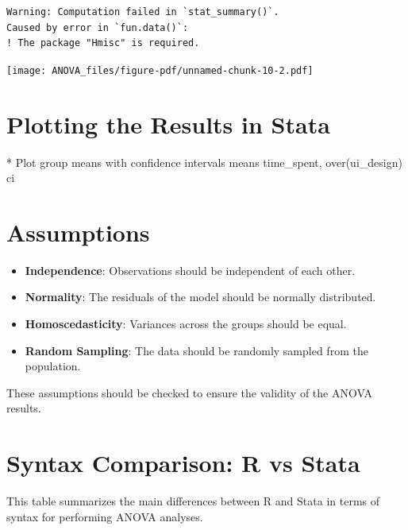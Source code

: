\documentclass[
  letterpaper,
  DIV=11,
  numbers=noendperiod]{scrreprt}
\newenvironment{Shaded}{\begin{snugshade}}{\end{snugshade}}
\newcommand{\BaseNTok}[1]{\textcolor[rgb]{0.68,0.00,0.00}{#1}}
\newcommand{\FunctionTok}[1]{\textcolor[rgb]{0.28,0.35,0.67}{#1}}
\newcommand{\KeywordTok}[1]{\textcolor[rgb]{0.00,0.23,0.31}{#1}}
\newcommand{\NormalTok}[1]{\textcolor[rgb]{0.00,0.23,0.31}{#1}}
\providecommand{\tightlist}{%
  \setlength{\itemsep}{0pt}\setlength{\parskip}{0pt}}\usepackage{longtable,booktabs,array}
\begin{document}
\begin{verbatim}
Warning: Computation failed in `stat_summary()`.
Caused by error in `fun.data()`:
! The package "Hmisc" is required.
\end{verbatim}

\texttt{[image: ANOVA\_files/figure-pdf/unnamed-chunk-10-2.pdf]}

\section{Plotting the Results in
Stata}\label{plotting-the-results-in-stata}

\begin{Shaded}
\begin{Highlighting}[]
\NormalTok{* Plot }\FunctionTok{group} \KeywordTok{means}\NormalTok{ with confidence intervals}
\KeywordTok{means}\NormalTok{ time\_spent, }\BaseNTok{over}\NormalTok{(ui\_design) }\KeywordTok{ci}
\end{Highlighting}
\end{Shaded}

\section{Assumptions}\label{assumptions}

\begin{itemize}
\tightlist
\item
  \textbf{Independence}: Observations should be independent of each
  other.
\item
  \textbf{Normality}: The residuals of the model should be normally
  distributed.
\item
  \textbf{Homoscedasticity}: Variances across the groups should be
  equal.
\item
  \textbf{Random Sampling}: The data should be randomly sampled from the
  population.
\end{itemize}

These assumptions should be checked to ensure the validity of the ANOVA
results.

\section{Syntax Comparison: R vs
Stata}\label{syntax-comparison-r-vs-stata}

This table summarizes the main differences between R and Stata in terms
of syntax for performing ANOVA analyses.
\end{document}
